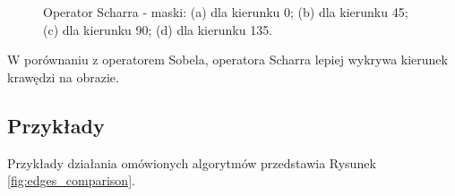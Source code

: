 \documentclass[a4paper,twocolumn,12pt]{article}
\begin{document}
\begin{figure}[!ht]
 \begin{center}
 \end{center}
 \caption{
  Operator Scharra - maski:
  (a) dla kierunku 0\textdegree;
  (b) dla kierunku 45\textdegree;
  (c) dla kierunku 90\textdegree;
  (d) dla kierunku 135\textdegree.
 }
 \label{fig:scharr_matrices}
\end{figure}

W porównaniu z operatorem Sobela, operatora Scharra lepiej wykrywa kierunek krawędzi na obrazie.


\subsection{Przykłady}

Przykłady działania omówionych algorytmów przedstawia Rysunek \ref{fig:edges_comparison}.
\end{document}
